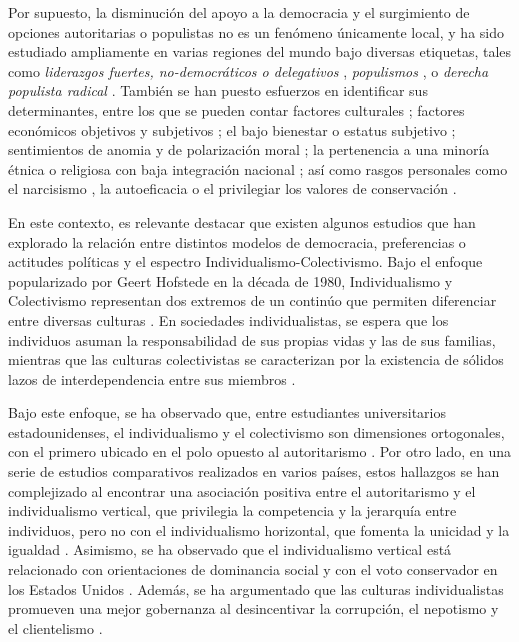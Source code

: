 \documentclass[12pt,twoside]{templates/facsothesis}
\begin{document}
Por supuesto, la disminución del apoyo a la democracia y el surgimiento de opciones autoritarias o populistas no es un fenómeno únicamente local, y ha sido estudiado ampliamente en varias regiones del mundo bajo diversas etiquetas, tales como \emph{liderazgos fuertes, no-democráticos o delegativos} \citep{carlin2011, carlin2018, crimston2022, kang2018, lima2021, selvanathan2022, xuereb2021}, \emph{populismos} \citep{baro2022, gidron2020, nowakowski2021}, o \emph{derecha populista radical} \citep{diaz2023, donovan2019, donovan2021}. También se han puesto esfuerzos en identificar sus determinantes, entre los que se pueden contar factores culturales \citep{lima2021, marchlewska2022, selvanathan2022}; factores económicos objetivos y subjetivos \citep{arikan2019, rico2020, wu2019, xuereb2021}; el bajo bienestar o estatus subjetivo \citep{gidron2020, nowakowski2021}; sentimientos de anomia y de polarización moral \citep{crimston2022}; la pertenencia a una minoría étnica o religiosa con baja integración nacional \citep{eskelinen2020}; así como rasgos personales como el narcisismo \citep{marchlewska2019}, la autoeficacia \citep{rico2020} o el privilegiar los valores de conservación \citep{baro2022}.

En este contexto, es relevante destacar que existen algunos estudios que han explorado la relación entre distintos modelos de democracia, preferencias o actitudes políticas y el espectro Individualismo-Colectivismo. Bajo el enfoque popularizado por Geert Hofstede en la década de 1980, Individualismo y Colectivismo representan dos extremos de un continúo que permiten diferenciar entre diversas culturas \citep{oyserman2002}. En sociedades individualistas, se espera que los individuos asuman la responsabilidad de sus propias vidas y las de sus familias, mientras que las culturas colectivistas se caracterizan por la existencia de sólidos lazos de interdependencia entre sus miembros \citep{yoon2010}.

Bajo este enfoque, se ha observado que, entre estudiantes universitarios estadounidenses, el individualismo y el colectivismo son dimensiones ortogonales, con el primero ubicado en el polo opuesto al autoritarismo \citep{gelfand1996}. Por otro lado, en una serie de estudios comparativos realizados en varios países, estos hallazgos se han complejizado al encontrar una asociación positiva entre el autoritarismo y el individualismo vertical, que privilegia la competencia y la jerarquía entre individuos, pero no con el individualismo horizontal, que fomenta la unicidad y la igualdad \citep{kemmelmeier2003}. Asimismo, se ha observado que el individualismo vertical está relacionado con orientaciones de dominancia social \citep{strunk1999} y con el voto conservador en los Estados Unidos \citep{zhang2009}. Además, se ha argumentado que las culturas individualistas promueven una mejor gobernanza al desincentivar la corrupción, el nepotismo y el clientelismo \citep{kyriacou2016}.
\end{document}
